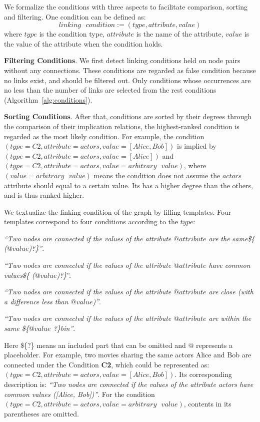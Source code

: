 We formalize the conditions with three aspects to facilitate comparison, sorting and filtering.
One condition can be defined as:
\begin{equation}
    linking\text{ }condition := ( type, attribute, value )
\end{equation}
where $type$ is the condition type, $attribute$ is the name of the attribute, $value$ is the value of the attribute when the condition holds.

\textbf{Filtering Conditions}.
We first detect linking conditions held on node pairs without any connections.
These conditions are regarded as false condition because no links exist, and should be filtered out.
Only conditions whose occurrences are no less than the number of links are selected from the rest conditions (Algorithm~\ref{alg:conditions}).

\textbf{Sorting Conditions}.
After that, conditions are sorted by their degrees through the comparison of their implication relations, the highest-ranked condition is regarded as the most likely condition.
For example, the condition $(type=C2, attribute=actors, value=[Alice, Bob])$ is implied by $(type=C2, attribute=actors, value=[Alice])$ and $(type=C2, attribute=actors, value=arbitrary\text{ }value)$, where $(value=arbitrary\text{ }value)$ means the condition does not assume the $actors$ attribute should equal to a certain value.
Its has a higher degree than the others, and is thus ranked higher.

We textualize the linking condition of the graph by filling templates. 
Four templates correspond to four conditions according to the $type$:
\begin{compactenum}[\textbf{T}1]
    \item \textit{``Two nodes are connected if the values of the attribute $@attribute$ are the same\$\{ ($@value$)?\}''}.
    \item \textit{``Two nodes are connected if the values of the attribute $@attribute$ have common values\$\{ ($@value$)?\}}''.
    \item \textit{``Two nodes are connected if the values of the attribute $@attribute$ are close (with a difference less than $@value$)''}.
    \item \textit{``Two nodes are connected if the values of the attribute $@attribute$ are within the same \$\{$@value$ ?\}bin''}.
\end{compactenum}
Here \$\{?\} means an included part that can be omitted and $@$ represents a placeholder.
For example, two movies sharing the same actors Alice and Bob are connected under the Condition \textbf{C2}, which could be represented as: $(type=C2, attribute=actors, value=[Alice, Bob])$. 
Its corresponding description is: \textit{``Two nodes are connected if the values of the attribute actors have common values ([Alice, Bob])''}. 
For the condition $(type=C2, attribute=actors, value=arbitrary\text{ }value)$, contents in its parentheses are omitted.

